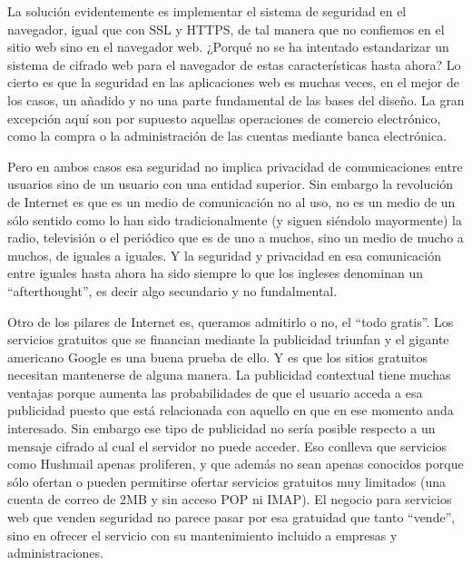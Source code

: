 
La solución evidentemente es implementar el sistema de seguridad en el navegador, igual que con SSL y HTTPS, de tal manera que no confiemos en el sitio web sino en el navegador web. ¿Porqué no se ha intentado estandarizar un sistema de cifrado web para el navegador de estas características hasta ahora? Lo cierto es que la seguridad en las aplicaciones web es muchas veces, en el mejor de los casos, un añadido y no una parte fundamental de las bases del diseño. La gran excepción aquí son por supuesto aquellas operaciones de comercio electrónico, como la compra o la administración de las cuentas mediante banca electrónica.

Pero en ambos casos esa seguridad no implica privacidad de comunicaciones entre usuarios sino de un usuario con una entidad superior. Sin embargo la revolución de Internet es que es un medio de comunicación no al uso, no es un medio de un sólo sentido como lo han sido tradicionalmente (y siguen siéndolo mayormente) la radio, televisión o el periódico que es de uno a muchos, sino un medio de mucho a muchos, de iguales a iguales. Y la seguridad y privacidad en esa comunicación entre iguales hasta ahora ha sido siempre lo que los ingleses denominan un ``afterthought'', es decir algo secundario y no fundalmental.

Otro de los pilares de Internet es, queramos admitirlo o no, el ``todo gratis''. Los servicios gratuitos que se financian mediante la publicidad triunfan y el gigante americano Google es una buena prueba de ello. Y es que los sitios gratuitos necesitan mantenerse de alguna manera. La publicidad contextual tiene muchas ventajas porque aumenta las probabilidades de que el usuario acceda a esa publicidad puesto que está relacionada con aquello en que en ese momento anda interesado. Sin embargo ese tipo de publicidad no sería posible respecto a un mensaje cifrado al cual el servidor no puede acceder. Eso conlleva que servicios como Hushmail apenas proliferen, y que además no sean apenas conocidos porque sólo ofertan o pueden permitirse ofertar servicios gratuitos muy limitados (una cuenta de correo de 2MB y sin acceso POP ni IMAP). El negocio para servicios web que venden seguridad no parece pasar por esa gratuidad que tanto ``vende'', sino en ofrecer el servicio con su mantenimiento incluido a empresas y administraciones.

